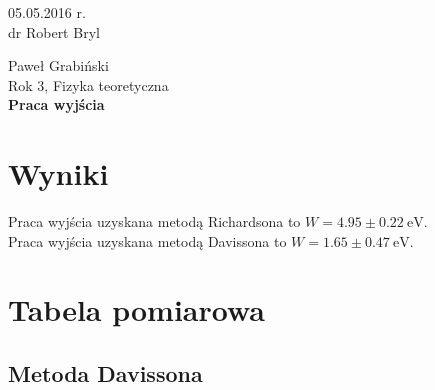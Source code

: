 \documentclass[paper=a4, fontsize=12pt]{scrartcl}
\begin{document}
\begin{flushright}
05.05.2016 r.\\
dr Robert Bryl
\end{flushright}Paweł Grabiński\\
Rok 3, Fizyka teoretyczna\\[0.5cm]
{\huge \bf Praca wyjścia}
\section{Wyniki}
Praca wyjścia uzyskana metodą Richardsona to $W=4.95\pm0.22\:\mathrm{eV}$.\\
Praca wyjścia uzyskana metodą Davissona to $W=1.65\pm0.47\:\mathrm{eV}$.
\section{Tabela pomiarowa}

\subsection{Metoda Davissona}
\end{document}
